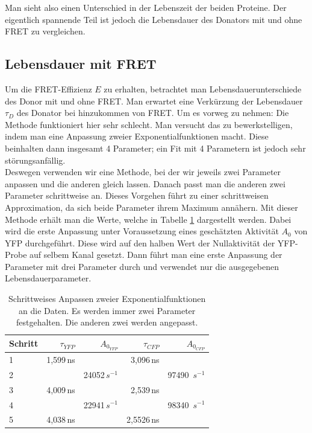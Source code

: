 Man sieht also einen Unterschied in der Lebenszeit der beiden Proteine. Der eigentlich spannende Teil 
ist jedoch die Lebensdauer des Donators mit und ohne FRET zu vergleichen.

\subsection{Lebensdauer mit FRET}

Um die FRET-Effizienz $E$ zu erhalten, betrachtet man Lebensdauerunterschiede des Donor mit und ohne FRET. 
Man erwartet eine Verkürzung der Lebensdauer $\tau_D$ des Donator bei hinzukommen von FRET. Um es vorweg zu nehmen: Die Methode funktioniert hier sehr schlecht. 
Man versucht das zu bewerkstelligen, indem man eine Anpassung zweier Exponentialfunktionen macht. Diese beinhalten dann insgesamt 4 Parameter; 
ein Fit mit 4 Parametern ist jedoch sehr störungsanfällig.\\

Deswegen verwenden wir eine Methode, bei der wir jeweils zwei Parameter anpassen und die anderen gleich lassen. Danach passt man die anderen zwei 
Parameter schrittweise an. Dieses Vorgehen führt zu einer schrittweisen Approximation, da sich beide Parameter ihrem Maximum annähern. Mit dieser 
Methode erhält man die Werte, welche in Tabelle \ref{LTFit} dargestellt werden. Dabei wird die erste Anpassung unter Voraussetzung eines geschätzten Aktivität $A_0$ 
von YFP durchgeführt. Diese wird auf den halben Wert der Nullaktivität der YFP-Probe auf selbem Kanal gesetzt. Dann führt man eine erste Anpassung der 
Parameter mit drei Parameter durch und verwendet nur die ausgegebenen Lebensdauerparameter.\\

\begin{table}[h]
    \centering
    \begin{tabular}{l|rr||rr}
        \toprule
        Schritt & $\tau_{YFP}$ & $A_{0_{YFP}} $&  $\tau_{CFP}$ & $A_{0_{CFP}}$\\
        \midrule
        1 & 1,599\,ns & & 3,096\,ns& \\
        2 & & 24052\,$s^{-1}$ & & 97490 \,$s^{-1}$\\
        3 & 4,009\,ns & & 2,539\,ns& \\
        4 & & 22941\,$s^{-1}$ & & 98340 \,$s^{-1}$\\
        5 & 4,038\,ns & & 2,5526\,ns& \\  
        \bottomrule
    \end{tabular}
    \caption{Schrittweises Anpassen zweier Exponentialfunktionen an die Daten. Es werden immer zwei Parameter festgehalten. Die anderen zwei werden 
    angepasst.}
    \label{LTFit}
\end{table}

